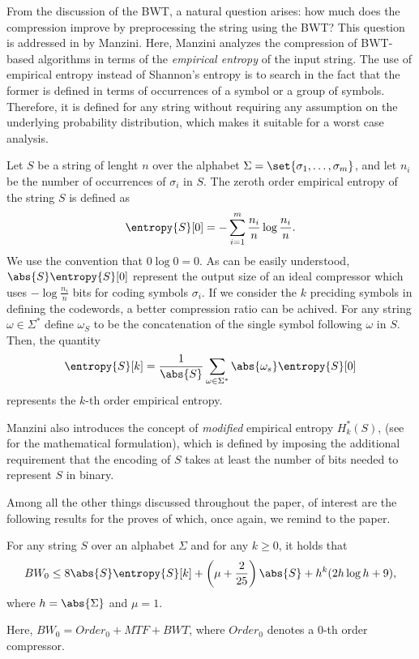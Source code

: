 \documentclass{subfiles}
\begin{document}
    From the discussion of the BWT, a natural question arises: how much does 
        the compression improve by preprocessing the string using the BWT? This 
        question is addressed in \cite{manzini2001} by Manzini. Here,
        Manzini analyzes the compression of BWT-based algorithms in terms of the 
        \emph{empirical entropy} of the input string. 
        The use of empirical entropy instead of Shannon's entropy is to search 
        in the fact that the former is defined in terms of occurrences of a symbol 
        or a group of symbols. Therefore, it is defined for any string without requiring 
        any assumption on the underlying probability distribution, 
        which makes it suitable for a worst case analysis.

    Let \(S\) be a string of lenght \(n\) over the alphabet \(\Sigma = \set{\sigma_{1}, \ldots, \sigma_{m}}\),
        and let \(n_{i}\) be the number of occurrences of \(\sigma_{i}\) in \(S\).
        The zeroth order empirical entropy of the string \(S\) is defined as 
        \[
            \entropy{S}[0] = - \sum_{i = 1}^{m} {\frac{n_{i}}{n} \log \frac{n_{i}}{n}}.
        \]
        We use the convention that \(0 \log 0 = 0\). As can be easily understood,
        \(\abs{S} \entropy{S}[0]\) represent the output size of an ideal compressor which 
        uses \(- \log \frac{n_{i}}{n}\) bits for coding symbols \(\sigma_{i}\).
        If we consider the \(k\) preciding symbols in defining the codewords, 
        a better compression ratio can be achived. For any string \(\omega \in \Sigma^{*}\)
        define \(\omega_{S}\) to be the concatenation of the single symbol following \(\omega\) in \(S\).
        Then, the quantity
        \[
            \entropy{S}[k] = \frac{1}{\abs{S}} \sum_{\omega \in \Sigma^{*}}
            \abs{\omega_{s}} \entropy{S}[0] 
        \]
        represents the \(k\)-th order empirical entropy.
        
    Manzini also introduces the concept of \emph{modified} empirical entropy \(H_{k}^{*}(S)\),
        (see \cite[Definition 2.1]{manzini2001} for the mathematical formulation),
        which is defined by imposing the additional requirement that the encoding of \(S\)
        takes at least the number of bits needed to represent \(S\) in binary.

    Among all the other things discussed throughout the paper, of interest are the following results
        for the proves of which, once again, we remind to the paper.
        \begin{theorem*}[Manzini]
            For any string \(S\) over an alphabet \(\Sigma\) and for any \(k \ge 0\), 
            it holds that
            \[
                BW_{0} \le 8 \abs{S} \entropy{S}[k] + 
                    \left( \mu + \frac{2}{25} \right) \abs{S} + 
                    h^{k} (2h \log h + 9),
            \]
            where \(h = \abs{\Sigma}\) and \(\mu = 1\).
        \end{theorem*}
        Here, \(BW_{0} = Order_{0} + MTF + BWT\), where \(Order_{0}\) denotes 
        a 0-th order compressor.
\end{document}
